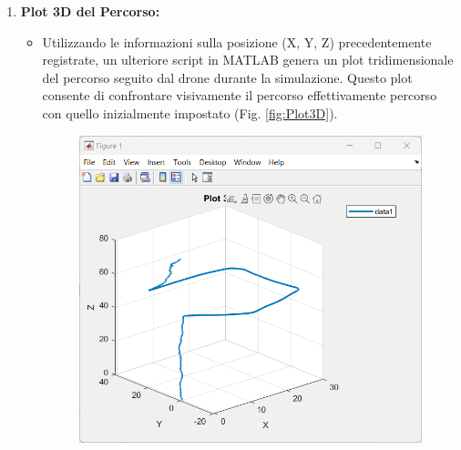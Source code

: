 \begin{enumerate}
    \item \textbf{Plot 3D del Percorso:}
    \begin{itemize}
        \item Utilizzando le informazioni sulla posizione (X, Y, Z) precedentemente registrate, un ulteriore script in MATLAB genera un plot tridimensionale del percorso seguito dal drone durante la simulazione. Questo plot consente di confrontare visivamente il percorso effettivamente percorso con quello inizialmente impostato (Fig. \ref{fig:Plot3D}).
        \begin{figure}[htbp]
            \begin{minipage}[b]{0.5\linewidth} %
              \centering
              \includegraphics[width=\linewidth]{files/images/plot3D.png} %
            \end{minipage}%
            \begin{minipage}[b]{0.5\linewidth} %
                \centering

\end{minipage}
\end{figure}
\end{itemize}
\end{enumerate}
